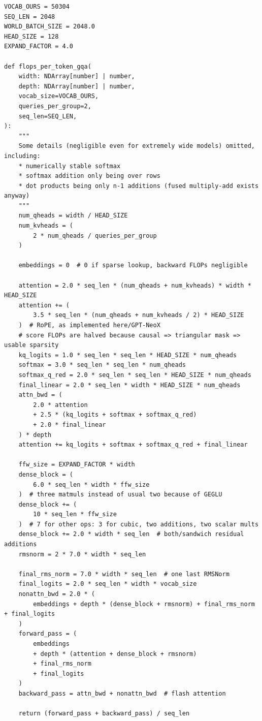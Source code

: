 \documentclass{article}
\begin{document}
\begin{verbatim}
VOCAB_OURS = 50304
SEQ_LEN = 2048
WORLD_BATCH_SIZE = 2048.0
HEAD_SIZE = 128
EXPAND_FACTOR = 4.0

def flops_per_token_gqa(
    width: NDArray[number] | number,
    depth: NDArray[number] | number,
    vocab_size=VOCAB_OURS,
    queries_per_group=2,
    seq_len=SEQ_LEN,
):
    """
    Some details (negligible even for extremely wide models) omitted, including:
    * numerically stable softmax
    * softmax addition only being over rows
    * dot products being only n-1 additions (fused multiply-add exists anyway)
    """
    num_qheads = width / HEAD_SIZE
    num_kvheads = (
        2 * num_qheads / queries_per_group
    )

    embeddings = 0  # 0 if sparse lookup, backward FLOPs negligible

    attention = 2.0 * seq_len * (num_qheads + num_kvheads) * width * HEAD_SIZE
    attention += (
        3.5 * seq_len * (num_qheads + num_kvheads / 2) * HEAD_SIZE
    )  # RoPE, as implemented here/GPT-NeoX
    # score FLOPs are halved because causal => triangular mask => usable sparsity
    kq_logits = 1.0 * seq_len * seq_len * HEAD_SIZE * num_qheads 
    softmax = 3.0 * seq_len * seq_len * num_qheads
    softmax_q_red = 2.0 * seq_len * seq_len * HEAD_SIZE * num_qheads
    final_linear = 2.0 * seq_len * width * HEAD_SIZE * num_qheads
    attn_bwd = (
        2.0 * attention
        + 2.5 * (kq_logits + softmax + softmax_q_red)
        + 2.0 * final_linear
    ) * depth
    attention += kq_logits + softmax + softmax_q_red + final_linear

    ffw_size = EXPAND_FACTOR * width
    dense_block = (
        6.0 * seq_len * width * ffw_size
    )  # three matmuls instead of usual two because of GEGLU
    dense_block += (
        10 * seq_len * ffw_size
    )  # 7 for other ops: 3 for cubic, two additions, two scalar mults
    dense_block += 2.0 * width * seq_len  # both/sandwich residual additions
    rmsnorm = 2 * 7.0 * width * seq_len 

    final_rms_norm = 7.0 * width * seq_len  # one last RMSNorm
    final_logits = 2.0 * seq_len * width * vocab_size
    nonattn_bwd = 2.0 * (
        embeddings + depth * (dense_block + rmsnorm) + final_rms_norm + final_logits
    )
    forward_pass = (
        embeddings
        + depth * (attention + dense_block + rmsnorm)
        + final_rms_norm
        + final_logits
    )
    backward_pass = attn_bwd + nonattn_bwd  # flash attention

    return (forward_pass + backward_pass) / seq_len
\end{verbatim}
\end{document}
